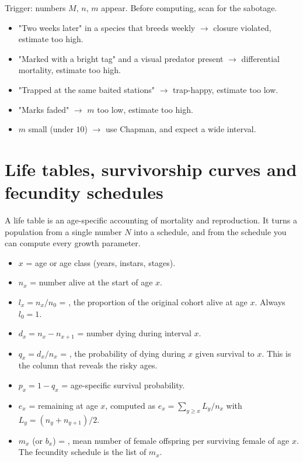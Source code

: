 \begin{tipbox}[title={TECHNIQUE: reading a mark-recapture stem for the trick}]
Trigger: numbers $M$, $n$, $m$ appear. Before computing, scan for the sabotage.
\begin{itemize}
\item "Two weeks later" in a species that breeds weekly $\rightarrow$ closure
violated, estimate too high.
\item "Marked with a bright tag" and a visual predator present $\rightarrow$
differential mortality, estimate too high.
\item "Trapped at the same baited stations" $\rightarrow$ trap-happy, estimate too
low.
\item "Marks faded" $\rightarrow$ $m$ too low, estimate too high.
\item $m$ small (under $10$) $\rightarrow$ use Chapman, and expect a wide
interval.
\end{itemize}
\end{tipbox}

\section{Life tables, survivorship curves and fecundity schedules}

A life table is an age-specific accounting of mortality and reproduction. It
turns a population from a single number $N$ into a schedule, and from the
schedule you can compute every growth parameter.

\begin{keybox}[title={MEMORIZE: the life table columns}]
\begin{itemize}
\item $x$ = age or age class (years, instars, stages).
\item $n_x$ = number alive at the start of age $x$.
\item $l_x=n_x/n_0$ = , the proportion of the original cohort
alive at age $x$. Always $l_0=1$.
\item $d_x=n_x-n_{x+1}$ = number dying during interval $x$.
\item $q_x=d_x/n_x$ = , the probability of dying
during $x$ given survival to $x$. This is the column that reveals the risky ages.
\item $p_x=1-q_x$ = age-specific survival probability.
\item $e_x$ =  remaining at age $x$, computed as
$e_x=\sum_{y\ge x}L_y/n_x$ with $L_y=(n_y+n_{y+1})/2$.
\item $m_x$ (or $b_x$) = , mean number of female offspring per
surviving female of age $x$. The fecundity schedule is the list of $m_x$.
\end{itemize}
\end{keybox}

